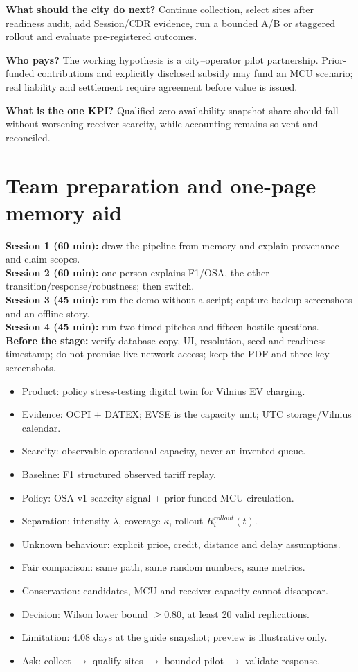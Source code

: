 \documentclass[11pt,a4paper]{article}
\begin{document}
\textbf{What should the city do next?} Continue collection, select sites after readiness audit, add Session/CDR evidence, run a bounded A/B or staggered rollout and evaluate pre-registered outcomes.

\textbf{Who pays?} The working hypothesis is a city--operator pilot partnership. Prior-funded contributions and explicitly disclosed subsidy may fund an MCU scenario; real liability and settlement require agreement before value is issued.

\textbf{What is the one KPI?} Qualified zero-availability snapshot share should fall without worsening receiver scarcity, while accounting remains solvent and reconciled.

\section{Team preparation and one-page memory aid}

\textbf{Session 1 (60 min):} draw the pipeline from memory and explain provenance and claim scopes.\\
\textbf{Session 2 (60 min):} one person explains F1/OSA, the other transition/response/robustness; then switch.\\
\textbf{Session 3 (45 min):} run the demo without a script; capture backup screenshots and an offline story.\\
\textbf{Session 4 (45 min):} run two timed pitches and fifteen hostile questions.\\
\textbf{Before the stage:} verify database copy, UI, resolution, seed and readiness timestamp; do not promise live network access; keep the PDF and three key screenshots.

\begin{itemize}
\item Product: policy stress-testing digital twin for Vilnius EV charging.
\item Evidence: OCPI + DATEX; EVSE is the capacity unit; UTC storage/Vilnius calendar.
\item Scarcity: observable operational capacity, never an invented queue.
\item Baseline: F1 structured observed tariff replay.
\item Policy: OSA-v1 scarcity signal + prior-funded MCU circulation.
\item Separation: intensity $\lambda$, coverage $\kappa$, rollout $R_i^{rollout}(t)$.
\item Unknown behaviour: explicit price, credit, distance and delay assumptions.
\item Fair comparison: same path, same random numbers, same metrics.
\item Conservation: candidates, MCU and receiver capacity cannot disappear.
\item Decision: Wilson lower bound $\ge0.80$, at least 20 valid replications.
\item Limitation: 4.08 days at the guide snapshot; preview is illustrative only.
\item Ask: collect $\to$ qualify sites $\to$ bounded pilot $\to$ validate response.
\end{itemize}
\end{document}
